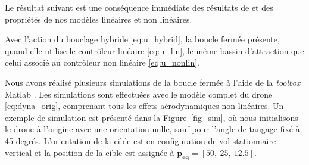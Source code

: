 Le résultat suivant est une conséquence immédiate des résultats de \cite[Ex. 1.7]{65} et des propriétés de nos modèles linéaires et non linéaires.

\begin{proposition}
    Avec l'action du bouclage hybride \eqref{eq:u_hybrid}, la boucle fermée présente, quand elle utilise le contrôleur linéaire \eqref{eq:u_lin}, le même bassin d'attraction que celui associé au contrôleur non linéaire \eqref{eq:u_nonlin}.
\end{proposition}

Nous avons réalisé plusieurs simulations de la boucle fermée à l'aide de la \textit{toolbox} Matlab \cite{sanfelice_2017}. Les simulations sont effectuées avec le modèle complet du drone \eqref{eq:dyna_orig}, comprenant tous les effets aérodynamiques non linéaires. Un exemple de simulation est présenté dans la Figure~\ref{fig_sim}, où nous initialisons le drone à l'origine avec une orientation nulle, sauf pour l'angle de tangage fixé à 45 degrés. L'orientation de la cible est en configuration de vol stationnaire vertical et la position de la cible est assignée à $\boldsymbol{p_{\text{eq}}} = [50,~25,~12.5]$.

